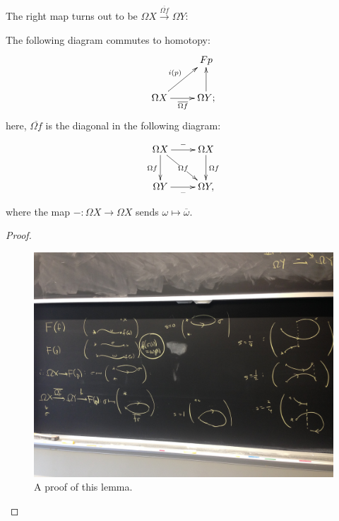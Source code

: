 The right map turns out to be $\Omega X\xrightarrow{\overline{\Omega f}}\Omega Y$:
\begin{lemma}
    The following diagram commutes to homotopy:
    \begin{equation*}
	\xymatrix{
	    & Fp\\
	    \Omega X\ar[r]_{\overline{\Omega f}}\ar[ur]^{i(p)} & \Omega Y;\ar[u]
	    }
    \end{equation*}
    here, $\overline{\Omega f}$ is the diagonal in the following diagram:
    \begin{equation*}
	\xymatrix{
	    \Omega X\ar[r]^{-}\ar[dr]|{\Omega f} \ar[d]_{\Omega f} & \Omega X\ar[d]^{\Omega f}\\
	    \Omega Y\ar[r]_{-} & \Omega Y,
	    }
    \end{equation*}
    where the map $-:\Omega X\to \Omega X$ sends $\omega\mapsto\overline{\omega}$.
\end{lemma}
\begin{proof}
\begin{figure}[H]
\centering
\includegraphics[width=\textwidth]{barratt-puppe}
\caption{A proof of this lemma.}
\end{figure}
\end{proof}
